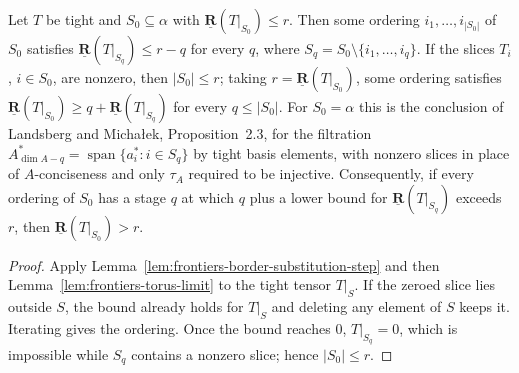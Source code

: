 \begin{theorem}
  \label{thm:frontiers-border-substitution}
  \leanok
  Let $T$ be tight and $S_0 \subseteq \alpha$ with
  $\underline{\mathbf{R}}(T|_{S_0}) \le r$. Then some ordering $i_1, \dots, i_{|S_0|}$
  of $S_0$ satisfies $\underline{\mathbf{R}}(T|_{S_q}) \le r - q$ for every $q$, where
  $S_q = S_0 \setminus \{i_1, \dots, i_q\}$. If the slices $T_i$, $i \in S_0$, are
  nonzero, then $|S_0| \le r$; taking $r = \underline{\mathbf{R}}(T|_{S_0})$, some
  ordering satisfies
  $\underline{\mathbf{R}}(T|_{S_0}) \ge q + \underline{\mathbf{R}}(T|_{S_q})$ for every
  $q \le |S_0|$. For $S_0 = \alpha$ this is the conclusion of Landsberg and
  Micha{\l}ek, Proposition~2.3, for the filtration $A_{\dim A - q}^* =
  \operatorname{span}\{a_i^* : i \in S_q\}$ by tight basis elements, with nonzero slices in
  place of $A$-conciseness and only $\tau_A$ required to be injective. Consequently, if
  every ordering of $S_0$ has a stage $q$ at which $q$ plus a lower bound for
  $\underline{\mathbf{R}}(T|_{S_q})$ exceeds $r$, then
  $\underline{\mathbf{R}}(T|_{S_0}) > r$.
\end{theorem}
\begin{proof}
  \leanok
  Apply Lemma~\ref{lem:frontiers-border-substitution-step} and then
  Lemma~\ref{lem:frontiers-torus-limit} to the tight tensor $T|_S$. If the zeroed slice
  lies outside $S$, the bound already holds for $T|_S$ and deleting any element of $S$
  keeps it. Iterating gives the ordering. Once the bound reaches $0$, $T|_{S_q} = 0$, which
  is impossible while $S_q$ contains a nonzero slice; hence $|S_0| \le r$.
\end{proof}

